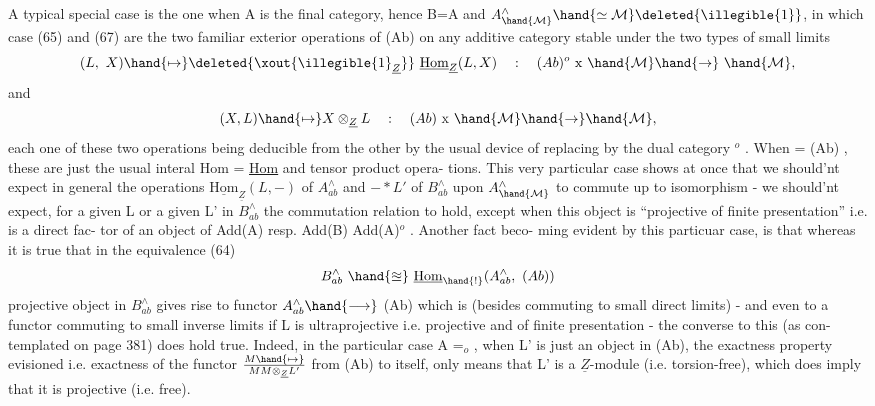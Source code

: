 A typical special case is the one when A is the final category,
hence B=A and\newline
$A^\wedge_{\hand{\mathcal{M}}}\hand{\simeq \mathcal{M}}\deleted{\illegible{1}}$, in which case (65) and (67) are the two familiar
exterior operations of (Ab) on any additive category stable under the
two types of small limits
\[ (L,\ X)\hand{\mapsto}\deleted{\xout{\illegible{1}_{\underline{Z}}}}\ \underline{\mathrm{Hom}}_{\underline{Z}}(L,X) \quad : \quad (Ab)^{o}\ \mathrm{x}\ \hand{\mathcal{M}}\hand{\to}\ \hand{\mathcal{M}}, \]
and
\[ (X,L)\hand{\mapsto} X\otimes_{\underline{Z}}L \quad : \quad (Ab)\ \mathrm{x}\ \hand{\mathcal{M}}\hand{\to}\hand{\mathcal{M}}, \]
each one of these two operations being deducible from the other by the
usual device of replacing  by the dual category $^{o}$ .  When = (Ab) ,
these are just the usual interal  Hom = \uline{Hom}  and tensor product opera-%
tions.  This very particular case shows at once that we should'nt expect
in general the operations  $\underline{\mathrm{Hom}}_{\underline{Z}}(L,-)$ of $A^\wedge_{ab}$  and  $-*L'$  of $B^\wedge_{ab}$  upon
$A^\wedge_{\hand{\mathcal{M}}}$  to commute up to isomorphism  -  we should'nt expect,  for a given
L  or a given L' in $B^\wedge_{ab}$ the commutation relation to hold,  except when
this object is ``projective of finite presentation''  i.e. is a direct fac-%
tor of an object of Add(A)  resp.  Add(B) \hand{$\approxeq$} Add(A)$^{o}$ .  Another fact beco-%
ming evident by this particuar case,  is that whereas it is true that
in the equivalence (64)
\[ B^\wedge_{ab}\ \hand{\approxeq}\ \underline{\mathrm{Hom}}_{\hand{!}}(A^\wedge_{ab},\ (Ab)) \]
 projective object  in $B^\wedge_{ab}$ gives rise to  functor  $A^\wedge_{ab}\hand{\longrightarrow}$ (Ab) which is
\hand{\uline{\textcolor{black}{exact}}} (besides commuting to  small direct limits)  -  and even to a
functor commuting to small inverse limits if L is ultraprojective i.e.
projective and of finite presentation -  the converse to this (as con-%
templated on page 381) does \hand{\uline{\textcolor{black}{not}}} hold true.  Indeed,  in the particular
case A =\hand{$\Delta$}$_{o}$ ,  when L' is just an  object in (Ab),  the
exactness property evisioned i.e. exactness of the functor  $M\hand{\mapsto}\over{M}{M}\otimes_{\underline{Z}}L'$
from (Ab) to itself,  only means that L' is a \hand{\uline{\textcolor{black}{flat}}}  $\underline{Z}$-module (i.e.
torsion-free),  which does \hand{\uline{\textcolor{black}{not}}} imply that it is projective (i.e. free).

